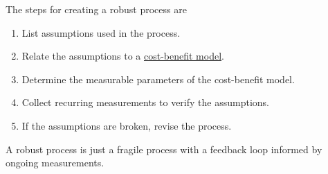 The steps for creating a robust process are
\begin{enumerate}
    \item List assumptions used in the process. 
    \item Relate the assumptions to a \href{https://en.wikipedia.org/wiki/Cost\%E2\%80\%93benefit_analysis}{cost-benefit model}.
    \item Determine the measurable parameters of the cost-benefit model. 
    \item Collect recurring measurements to verify the assumptions. 
    \item If the assumptions are broken, revise the process. 
\end{enumerate}
A robust process is just a fragile process with a feedback loop informed by ongoing measurements. 